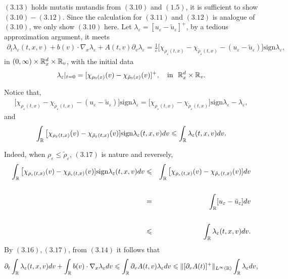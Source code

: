 \documentclass[11pt]{article}
\begin{document}
$(3.13)$ holds mutatis mutandis from $(3.10)$ and $(1.5)$, it is
sufficient to show $(3.10)-(3.12)$. Since the calculation for
$(3.11)$ and $(3.12)$ is analogue of $(3.10)$, we only show $(3.10)$
here. Let
$\lambda_\varepsilon=[u_\varepsilon-\tilde{u}_\varepsilon]^+$, by a
tedious approximation argument, it meets
\begin{eqnarray}\label{3.14}
\partial_t\lambda_\varepsilon(t,x,v)+b(v)\cdot\nabla_x\lambda_\varepsilon+A(t,v)
\partial_v\lambda_\varepsilon=
\frac{1}{\varepsilon} {\big[}
\chi_{\rho_\varepsilon(t,x)}-\chi_{\tilde{\rho}_\varepsilon(t,x)}
-(u_\varepsilon-\tilde{u}_\varepsilon){\big]}\mbox{sign}
\lambda_\varepsilon,
\end{eqnarray}
in $(0,\infty)\times{\mathbb R}^d_x\times{\mathbb R}_v$, with the initial data
\begin{eqnarray}\label{3.15}
\lambda_\varepsilon|_{t=0}=[\chi_{\rho_0(x)}(v)-\chi_{\tilde{\rho}_0(x)}(v)]^+,
\quad \mbox{in} \ \ {\mathbb R}^d_x\times{\mathbb R}_v.
\end{eqnarray}
 \vskip1mm\par
Notice that,
\begin{eqnarray}\label{3.16}
{\big[}
\chi_{\rho_\varepsilon(t,x)}-\chi_{\tilde{\rho}_\varepsilon(t,x)}
-(u_\varepsilon-\tilde{u}_\varepsilon){\big]}\mbox{sign}
\lambda_\varepsilon={\big[}
\chi_{\rho_\varepsilon(t,x)}-\chi_{\tilde{\rho}_\varepsilon(t,x)}]\mbox{sign}
\lambda_\varepsilon -\lambda_\varepsilon,
\end{eqnarray}
and
\begin{eqnarray}\label{3.17}
\int_{{\mathbb R}}{\big[}
\chi_{\rho_\varepsilon(t,x)}(v)-\chi_{\tilde{\rho}_\varepsilon(t,x)}(v)]\mbox{sign}
\lambda_\varepsilon(t,x,v)dv\leqslant \int_{{\mathbb R}}
\lambda_\varepsilon(t,x,v)dv.
\end{eqnarray}
 \vskip1mm\par
Indeed, when $\rho_\varepsilon\leq \tilde{\rho}_\varepsilon$,
$(3.17)$ is nature and reversely,
\begin{eqnarray*}
\int_{{\mathbb R}}{\big[}
\chi_{\rho_\varepsilon(t,x)}(v)-\chi_{\tilde{\rho}_\varepsilon(t,x)}(v)]\mbox{sign}
\lambda_\varepsilon(t,x,v)dv &\leqslant& \int_{{\mathbb R}}{\big[}
\chi_{\rho_\varepsilon(t,x)}(v)-\chi_{\tilde{\rho}_\varepsilon(t,x)}(v)]dv
\cr \cr &=&\int_{{\mathbb R}} [u_\varepsilon-\tilde{u}_\varepsilon]dv \cr
\cr &\leqslant&\int_{{\mathbb R}} \lambda_\varepsilon(t,x,v)dv.
\end{eqnarray*}
By $(3.16), (3.17)$, from $(3.14)$ it follows that
\begin{eqnarray*}
\partial_t\int_{{\mathbb R}}\lambda_\varepsilon(t,x,v)dv+
\int_{{\mathbb R}}b(v)\cdot\nabla_x\lambda_\varepsilon dv\leqslant
\int_{{\mathbb R}}\partial_vA(t,v) \lambda_\varepsilon dv\leqslant
\|[\partial_vA(t)]^+\|_{L^\infty({\mathbb R})}\int_{{\mathbb R}}\lambda_\varepsilon
dv,
\end{eqnarray*}
\end{document}
